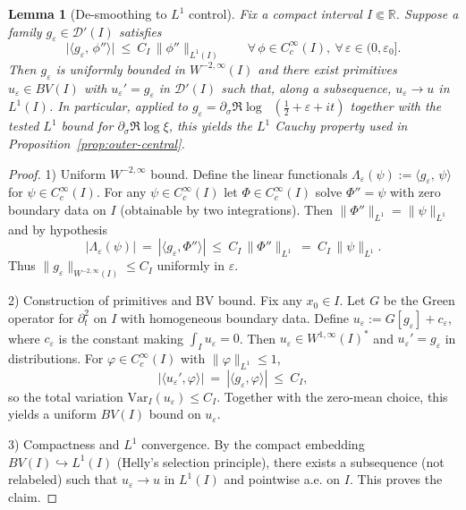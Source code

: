 \documentclass[11pt]{article}
\newtheorem{lemma}[theorem]{Lemma}
\theoremstyle{definition}
\theoremstyle{remark}
\newcommand{\R}{\mathbb{R}}
\DeclareMathOperator{\dettwo}{det_2}
\begin{document}


\begin{lemma}[De-smoothing to $L^1$ control]\label{lem:desmooth-L1}
Fix a compact interval $I\Subset\R$. Suppose a family $g_\varepsilon\in\mathcal D'(I)$ satisfies
\[
  \big|\langle g_\varepsilon,\,\phi''\rangle\big|\ \le\ C_I\,\|\phi''\|_{L^1(I)}\qquad\forall\,\phi\in C_c^\infty(I),\ \forall\,\varepsilon\in(0,\varepsilon_0].
\]
Then $g_\varepsilon$ is uniformly bounded in $W^{-2,\infty}(I)$ and there exist primitives $u_\varepsilon\in BV(I)$ with $u_\varepsilon' = g_\varepsilon$ in $\mathcal D'(I)$ such that, along a subsequence, $u_\varepsilon\to u$ in $L^1(I)$. In particular, applied to $g_\varepsilon=\partial_\sigma\Re\log\dettwo(\tfrac12+\varepsilon+it)$ together with the tested $L^1$ bound for $\partial_\sigma\Re\log\xi$, this yields the $L^1$ Cauchy property used in Proposition~\ref{prop:outer-central}.
\end{lemma}
\begin{proof}
1) Uniform $W^{-2,\infty}$ bound. Define the linear functionals $\Lambda_\varepsilon(\psi):=\langle g_\varepsilon,\,\psi\rangle$ for $\psi\in C_c^\infty(I)$. For any $\psi\in C_c^\infty(I)$ let $\Phi\in C_c^\infty(I)$ solve $\Phi''=\psi$ with zero boundary data on $I$ (obtainable by two integrations). Then $\|\Phi''\|_{L^1}=\|\psi\|_{L^1}$ and by hypothesis
\[
  |\Lambda_\varepsilon(\psi)|\ =\ |\langle g_\varepsilon,\Phi''\rangle|\ \le\ C_I\,\|\Phi''\|_{L^1}\ =\ C_I\,\|\psi\|_{L^1}.
\]
Thus $\|g_\varepsilon\|_{W^{-2,\infty}(I)}\le C_I$ uniformly in $\varepsilon$.

2) Construction of primitives and BV bound. Fix any $x_0\in I$. Let $G$ be the Green operator for $\partial_t^2$ on $I$ with homogeneous boundary data. Define $u_\varepsilon:=G[g_\varepsilon]+c_\varepsilon$, where $c_\varepsilon$ is the constant making $\int_I u_\varepsilon=0$. Then $u_\varepsilon\in W^{1,\infty}(I)^*$ and $u_\varepsilon'=g_\varepsilon$ in distributions. For $\varphi\in C_c^\infty(I)$ with $\|\varphi\|_{L^1}\le 1$,
\[
  |\langle u_\varepsilon',\varphi\rangle|\ =\ |\langle g_\varepsilon,\varphi\rangle|\ \le\ C_I,
\]
so the total variation $\mathrm{Var}_I(u_\varepsilon)\le C_I$. Together with the zero-mean choice, this yields a uniform $BV(I)$ bound on $u_\varepsilon$.

3) Compactness and $L^1$ convergence. By the compact embedding $BV(I)\hookrightarrow L^1(I)$ (Helly's selection principle), there exists a subsequence (not relabeled) such that $u_\varepsilon\to u$ in $L^1(I)$ and pointwise a.e. on $I$. This proves the claim.
\end{proof}
\end{document}
